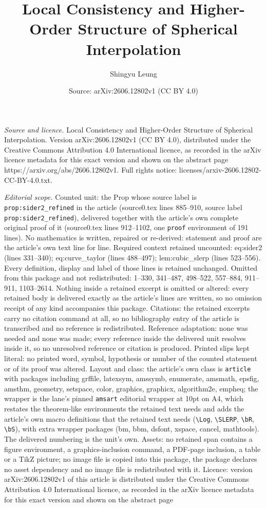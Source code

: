 \documentclass[10pt,a4paper]{amsart}
\title[Local Consistency and Higher-Order Structure of Spherical In]{Local Consistency and Higher-Order Structure of Spherical Interpolation}
\author{Shingyu Leung}
\date{Source: arXiv:2606.12802v1 (CC BY 4.0)}
\begin{document}
\maketitle

\noindent\emph{Source and licence.} Local Consistency and Higher-Order Structure of Spherical Interpolation. Version arXiv:2606.12802v1 (CC BY 4.0), distributed under the Creative Commons Attribution 4.0 International licence, as recorded in the arXiv licence metadata for this exact version and shown on the abstract page https://arxiv.org/abs/2606.12802v1. Full rights notice: licenses/arxiv-2606.12802-CC-BY-4.0.txt.\par\smallskip

\noindent\textit{Editorial scope.} Counted unit: the Prop whose source label is \texttt{prop:sider2\_refined} in the article (source0.tex lines 885--910, source label \texttt{prop:sider2\_refined}), delivered together with the article's own complete original proof of it (source0.tex lines 912--1102, one \texttt{proof} environment of 191 lines). No mathematics is written, repaired or re-derived: statement and proof are the article's own text line for line. Required context retained uncounted: eq:sider2 (lines 331--340); eq:curve\_taylor (lines 488--497); lem:cubic\_slerp (lines 523--556). Every definition, display and label of those lines is retained unchanged. Omitted from this package and not redistributed: 1--330, 341--487, 498--522, 557--884, 911--911, 1103--2614. Nothing inside a retained excerpt is omitted or altered: every retained body is delivered exactly as the article's lines are written, so no omission receipt of any kind accompanies this package. Citations: the retained excerpts carry no citation command at all, so no bibliography entry of the article is transcribed and no reference is redistributed. Reference adaptation: none was needed and none was made; every reference inside the delivered unit resolves inside it, so no unresolved reference or citation is produced. Printed slips kept literal: no printed word, symbol, hypothesis or number of the counted statement or of its proof was altered. Layout and class: the article's own class is \texttt{article} with packages including grffile, latexsym, amssymb, enumerate, amsmath, epsfig, amsthm, geometry, setspace, color, graphics, graphicx, algorithm2e, empheq; the wrapper is the lane's pinned \texttt{amsart} editorial wrapper at 10pt on A4, which restates the theorem-like environments the retained text needs and adds the article's own macro definitions that the retained text needs (\texttt{\textbackslash Log}, \texttt{\textbackslash SLERP}, \texttt{\textbackslash bR}, \texttt{\textbackslash bS}), with extra wrapper packages (bm, bbm, dsfont, xspace, cancel, mathtools). The delivered numbering is the unit's own. Assets: no retained span contains a figure environment, a graphics-inclusion command, a PDF-page inclusion, a table or a TikZ picture; no image file is copied into this package, the package declares no asset dependency and no image file is redistributed with it. Licence: version arXiv:2606.12802v1 of this article is distributed under the Creative Commons Attribution 4.0 International licence, as recorded in the arXiv licence metadata for this exact version and shown on the abstract page 
\end{document}
